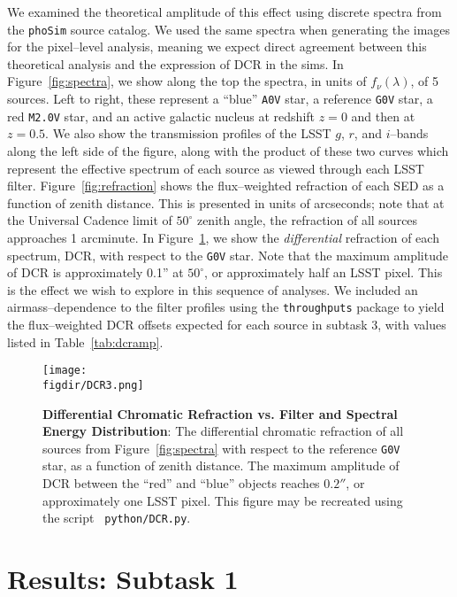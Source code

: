 \documentclass[prd, nofootinbib, floatfix, 11pt, tightenlines, times]{article}
\def\figdir{../figures}
\begin{document}
We examined the theoretical amplitude of this effect using discrete
spectra from the {\tt phoSim} source catalog.  We used the same
spectra when generating the images for the pixel--level analysis,
meaning we expect direct agreement between this theoretical analysis
and the expression of DCR in the sims.  In Figure~\ref{fig:spectra},
we show along the top the spectra, in units of $f_\nu(\lambda)$, of 5
sources.  Left to right, these represent a ``blue'' {\tt A0V} star, a
reference {\tt G0V} star, a red {\tt M2.0V} star, and an active
galactic nucleus at redshift $z=0$ and then at $z=0.5$.  We also show
the transmission profiles of the LSST $g$, $r$, and $i$--bands along
the left side of the figure, along with the product of these two
curves which represent the effective spectrum of each source as viewed
through each LSST filter.  Figure~\ref{fig:refraction} shows the
flux--weighted refraction of each SED as a function of zenith
distance.  This is presented in units of arcseconds; note that at the
Universal Cadence limit of $50^{\circ}$ zenith angle, the refraction
of all sources approaches 1 arcminute.  In Figure~\ref{fig:dcr}, we
show the {\it differential} refraction of each spectrum, DCR, with
respect to the {\tt G0V} star.  Note that the maximum amplitude of DCR
is approximately 0.1'' at $50^{\circ}$, or approximately half an LSST
pixel.  This is the effect we wish to explore in this sequence of
analyses.  We included an airmass--dependence to the filter profiles
using the {\tt throughputs} package to yield the flux--weighted DCR
offsets expected for each source in subtask 3, with values listed in
Table~\ref{tab:dcramp}.

\begin{figure}[!t]
  \centering
  \texttt{[image: \\figdir/DCR3.png]}
  \caption{{\bf Differential Chromatic Refraction vs. Filter and
      Spectral Energy Distribution}: The differential chromatic
    refraction of all sources from Figure~\ref{fig:spectra} with
    respect to the reference {\tt G0V} star, as a function of zenith
    distance.  The maximum amplitude of DCR between the ``red'' and
    ``blue'' objects reaches $0.2''$, or approximately one LSST pixel.
    This figure may be recreated using the script {\tt
      python/DCR.py}.}
  \label{fig:dcr}
\end{figure}



\section{Results: Subtask 1 \label{sec:task1}}
\end{document}
